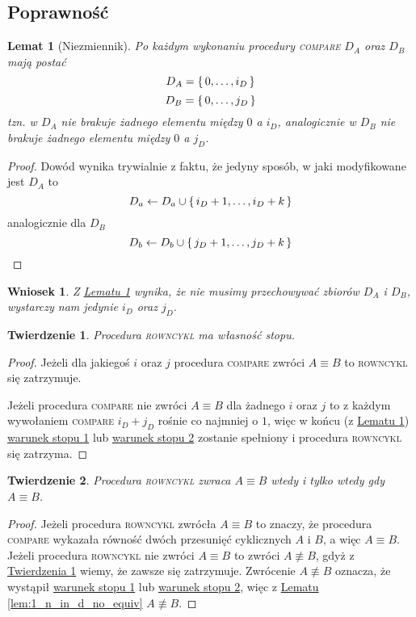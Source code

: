 \documentclass{scrartcl}
\theoremstyle{definition}
\theoremstyle{plain}
\theoremstyle{remark}
\theoremstyle{plain}
\newtheorem{lemma_niezmiennik}[lemma_equiv_if_lex_min_eq]{Lemat}
\newtheorem{not_storing_sets}{Wniosek}[section]
\newtheorem{termination_theorem}{Twierdzenie}[section]
\newtheorem{correctness_theorem}[termination_theorem]{Twierdzenie}
\theoremstyle{definition}
\theoremstyle{plain}
\begin{document}
\subsection{Poprawność}
\begin{lemma_niezmiennik}[Niezmiennik]
	\label{lem:niezmiennik}
	Po każdym wykonaniu procedury \textnormal{\textsc{compare}}
	\(D_A\) oraz \(D_B\) mają postać
	\[D_A=\set{0,\dots,i_D}\]
	\[D_B=\set{0,\dots,j_D}\]
	tzn. w \(D_A\) nie brakuje żadnego elementu
	między \(0\) a \(i_D\), analogicznie w \(D_B\)
	nie brakuje
	żadnego elementu między \(0\) a \(j_D\).
\end{lemma_niezmiennik}
\begin{proof}
	Dowód wynika trywialnie z faktu, że
	jedyny sposób, w jaki modyfikowane jest \(D_A\)
	to \[D_a\gets D_a\cup\set{i_D+1,\dots,i_D+k}\]
	analogicznie dla \(D_B\)
	\[D_b\gets D_b\cup\set{j_D+1,\dots,j_D+k}\]
\end{proof}
\begin{not_storing_sets}
	\label{cor:not_storing_sets}
	Z \hyperref[lem:niezmiennik]{Lematu \ref*{lem:niezmiennik}}
	wynika, że nie musimy przechowywać zbiorów \(D_A\) i \(D_B\),
	wystarczy nam jedynie \(i_D\) oraz \(j_D\).
\end{not_storing_sets}
\begin{termination_theorem}
	\label{thm:termination}
	Procedura \textnormal{\textsc{rowncykl}}
	ma własność stopu.
\end{termination_theorem}
\begin{proof}
	Jeżeli dla jakiegoś \(i\) oraz \(j\) procedura
	\textsc{compare} zwróci \(A\equiv B\) to
	\textsc{rowncykl} się zatrzymuje.

	Jeżeli procedura \textsc{compare} nie zwróci \(A\equiv B\)
	dla żadnego \(i\) oraz \(j\) to z każdym wywołaniem
	\textsc{compare} \(i_D+j_D\) rośnie co najmniej o \(1\),
	więc w końcu
	(z \hyperref[lem:niezmiennik]{Lematu \ref*{lem:niezmiennik}})
	\hyperref[term_cond_1]{warunek stopu 1}
	lub \hyperref[term_cond_2]{warunek stopu 2}
	zostanie spełniony i procedura
	\textsc{rowncykl} się zatrzyma.
\end{proof}
\begin{correctness_theorem}
	\label{thm:correctness}
	Procedura \textnormal{\textsc{rowncykl}}
	zwraca \(A\equiv B\) wtedy i tylko wtedy
	gdy \(A\equiv B\).
\end{correctness_theorem}
\begin{proof}
	Jeżeli procedura \textsc{rowncykl} zwrócła \(A\equiv B\)
	to znaczy, że procedura \textsc{compare}
	wykazała równość dwóch przesunięć cyklicznych \(A\) i \(B\),
	a więc \(A\equiv B\).
	Jeżeli procedura \textsc{rowncykl} nie zwróci \(A\equiv B\)
	to zwróci \(A\not\equiv B\), gdyż z
	\hyperref[thm:termination]{Twierdzenia \ref*{thm:termination}}
	wiemy, że zawsze się zatrzymuje.
	Zwrócenie \(A\not\equiv B\) oznacza, że wystąpił
	\hyperref[term_cond_1]{warunek stopu 1} lub
	\hyperref[term_cond_2]{warunek stopu 2},
	więc z \hyperref[lem:1_n_in_d_no_equiv]
	{Lematu \ref*{lem:1_n_in_d_no_equiv}} \(A\not\equiv B\).
\end{proof}
\pagebreak
\end{document}
